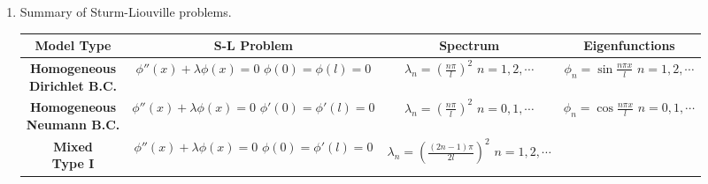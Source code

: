 \begin{enumerate}
\item Summary of Sturm-Liouville problems.

\begin{center}\small
\begin{tabular}{|c|c|c|c|}
    \hline
    \parbox[c][30pt]{90pt}{\centering \textbf{Model Type}} & 
    \parbox[c][30pt]{90pt}{\centering \textbf{S-L Problem}} & \parbox[t]{90pt}{\centering \textbf{Spectrum}} & 
    \parbox[c][30pt]{90pt}{\centering \textbf{Eigenfunctions}} \\
    \hline
    \parbox[c][30pt]{90pt}{\centering \textbf{Homogeneous \\ \vspace{10pt} Dirichlet B.C.}} & 
    \parbox[c][60pt]{90pt}{\centering $\phi''(x) + \lambda \phi(x)=0$ \\ \vspace{10pt} $\phi(0)=\phi(l)=0$}
    & 
    \parbox[c][60pt]{90pt}{\centering $\displaystyle \lambda_{n}=\left( \frac{n\pi}{l} \right)^{2}$ \\ \vspace{10pt} $n=1, 2, \cdots$} & 
    \parbox[c][60pt]{90pt}{\centering $\displaystyle \phi_{n} = \sin\frac{n\pi x}{l}$ \\ \vspace{10pt} $n=1, 2, \cdots$} \\
    \hline 
    \parbox[c][30pt]{90pt}{\centering \textbf{Homogeneous \\ \vspace{10pt} Neumann B.C.}} & 
    \parbox[c][60pt]{90pt}{\centering $\phi''(x) + \lambda \phi(x)=0$ \\ \vspace{10pt} $\phi'(0)=\phi'(l)=0$}
    & 
    \parbox[c][60pt]{90pt}{\centering $\displaystyle \lambda_{n}=\left( \frac{n\pi}{l} \right)^{2}$ \\ \vspace{10pt} $n=0, 1, \cdots$} & 
    \parbox[c][60pt]{90pt}{\centering $\displaystyle \phi_{n} = \cos\frac{n\pi x}{l}$ \\ \vspace{10pt} $n=0, 1, \cdots$} \\
    \hline
    \parbox[c][30pt]{90pt}{\centering \textbf{Mixed \\ \vspace{10pt} Type I}} & 
    \parbox[c][60pt]{90pt}{\centering $\phi''(x) + \lambda \phi(x)=0$ \\ \vspace{10pt} $\phi(0)=\phi'(l)=0$}
    & 
    \parbox[c][60pt]{100pt}{\centering $\displaystyle \lambda_{n}=\left( \frac{(2n-1)\pi}{2l} \right)^{2}$ \\ \vspace{10pt} $n=1, 2, \cdots$} & 

\end{tabular}
\end{center}
\end{enumerate}
